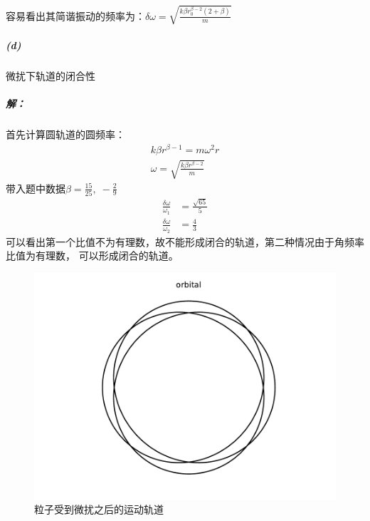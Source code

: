 \documentclass[a4paper]{ctexart}
\begin{document}
    容易看出其简谐振动的频率为：$\delta\omega = \sqrt{\frac{k\beta r_{0}^{\beta - 2}(2 + \beta)}{m}}$
    \subparagraph{(d)}微扰下轨道的闭合性
    \subparagraph{解：}
    首先计算圆轨道的圆频率：
    \begin{align}
        k\beta r^{\beta - 1} = m \omega^{2}r\\
        \omega = \sqrt{\frac{k\beta r^{\beta - 2}}{m}}
    \end{align}
    带入题中数据$\beta = \frac{15}{25},\;-\frac{2}{9}$
    \begin{align}
        \frac{\delta\omega}{\omega_{1}} &= \frac{\sqrt{65}}{5}\\
        \frac{\delta\omega}{\omega_{2}} &= \frac{4}{3}
    \end{align}
    可以看出第一个比值不为有理数，故不能形成闭合的轨道，第二种情况由于角频率比值为有理数，
    可以形成闭合的轨道。
    \begin{figure}[ht]
        \centering
        \includegraphics[scale=0.46]{orbital.pdf}
        \caption{粒子受到微扰之后的运动轨道}
    \end{figure}
\end{document}
